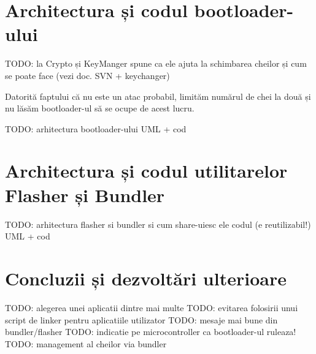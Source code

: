 \documentclass[12pt,a4paper,titlepage]{report}
\begin{document}
\section{Architectura și codul bootloader-ului}
TODO: la Crypto și KeyManger spune ca ele ajuta la schimbarea cheilor și cum se poate face (vezi doc. SVN + keychanger)

Datorită faptului că nu este un atac probabil, limităm numărul de chei la două și nu lăsăm bootloader-ul să se ocupe de acest lucru.

TODO: arhitectura bootloader-ului UML + cod

\section{Architectura și codul utilitarelor Flasher și Bundler}
TODO: arhitectura flasher si bundler si cum share-uiesc ele codul (e reutilizabil!) UML + cod

\section{Concluzii și dezvoltări ulterioare}
TODO: alegerea unei aplicatii dintre mai multe
TODO: evitarea folosirii unui script de linker pentru aplicatiile utilizator
TODO: mesaje mai bune din bundler/flasher
TODO: indicatie pe microcontroller ca bootloader-ul ruleaza!
TODO: management al cheilor via bundler

\newpage


\end{document}
